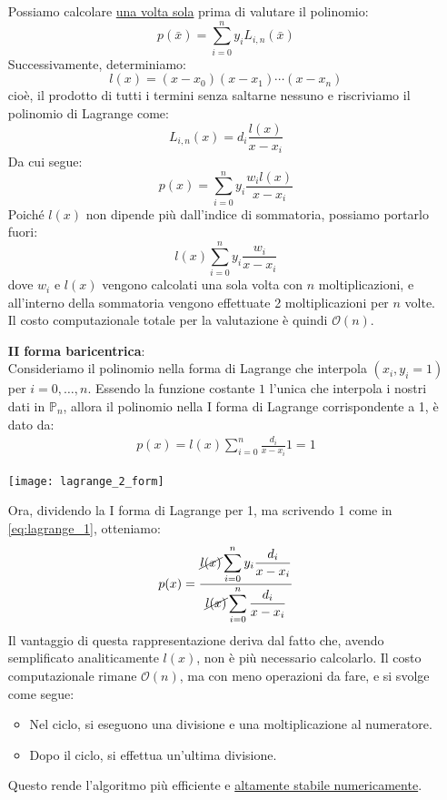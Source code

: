 \documentclass{article}
\begin{document}
\begin{itemize}
        Possiamo calcolare \underline{una volta sola} prima di valutare il polinomio:
        $$p(\bar{x})=\displaystyle\sum_{i=0}^{n}y_iL_{i,n}(\bar{x})$$
        Successivamente, determiniamo:
        $$l(x)=(x-x_0)(x-x_1)\cdots(x-x_n)$$
        cioè, il prodotto di tutti i termini senza saltarne nessuno e
        riscriviamo il polinomio di Lagrange come:
        $$L_{i,n}(x)=d_i \frac{l(x)}{x-x_i}$$
        Da cui segue:
        $$p(x)=\displaystyle\sum_{i=0}^{n}y_i \frac{w_il(x)}{x-x_i}$$
        Poiché $l(x)$ non dipende più dall'indice di sommatoria, possiamo
        portarlo fuori:
        $$l(x)\displaystyle\sum_{i=0}^{n}y_i \frac{w_i}{x-x_i}$$
        dove $w_i$ e $l(x)$ vengono calcolati una sola volta con $n$
        moltiplicazioni, e all'interno della sommatoria vengono effettuate 2
        moltiplicazioni per $n$ volte. Il costo computazionale totale per la
        valutazione è quindi $\mathcal{O}(n)$.
    \item [\textbf{II}] \textbf{forma baricentrica}:\\ 
        Consideriamo il polinomio nella forma di Lagrange che interpola $(x_i,
        y_i=1)$ per $i=0,\ldots,n$. Essendo la funzione costante $1$ l'unica
        che interpola i nostri dati in $\mathbb{P}_n$, allora  il polinomio
        nella I forma di Lagrange corrispondente a 1, è dato da:
        \begin{equation}\label{eq:lagrange_1}
           \begin{aligned}
               p(x)=l(x)\displaystyle\sum_{i=0}^{n}\frac{d_i}{x-x_i}1=1
           \end{aligned} 
        \end{equation}
        \begin{center}
            \texttt{[image: lagrange\_2\_form]}
        \end{center}
        Ora, dividendo la I forma di Lagrange per 1, ma scrivendo 1 come in
        \ref{eq:lagrange_1}, otteniamo: 
        \begin{equation*}
           \begin{aligned}
               p(x)=\frac{\cancel{l(x)}\displaystyle\sum_{i=0}^{n}y_i
                   \frac{d_i}{x-x_i}}{\cancel{l(x)} \displaystyle\sum_{i=0}^{n}
           \frac{d_i}{x-x_i}}
           \end{aligned} 
        \end{equation*}
        Il vantaggio di questa rappresentazione deriva dal fatto che,
        avendo semplificato analiticamente
        $l(x)$, non è più necessario calcolarlo. Il costo computazionale
        rimane $\mathcal{O}(n)$, ma con meno operazioni da fare, e si svolge come segue:
        \begin{itemize}
            \item Nel ciclo, si eseguono una divisione e una moltiplicazione
                al numeratore.
            \item Dopo il ciclo, si effettua un'ultima divisione.
        \end{itemize}
        Questo rende l'algoritmo più efficiente e \underline{altamente stabile
        numericamente}.
\end{itemize}
\end{document}
